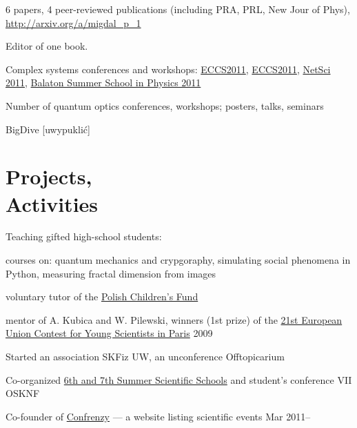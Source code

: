 \documentclass[margin,line]{resume}
\begin{document}
\begin{resume}
    6 papers, 4 peer-reviewed publications (including PRA, PRL, New Jour of Phys), \href{all available openly on arXiv}{http://arxiv.org/a/migdal\_p\_1}

    Editor of one book.

    Complex systems conferences and workshops: \href{http://www.eccs2012.eu/}{ECCS2011}, \href{http://www.eccs2011.eu/}{ECCS2011}, \href{http://netsci2011.net/}{NetSci 2011}, \href{http://bss.mafihe.hu/}{Balaton Summer School in Physics 2011}

    Number of quantum optics conferences, workshops; posters, talks, seminars

    BigDive [uwypuklić]


\vspace{3mm}


    \section{\mysidestyle Projects,\\Activities}
    Teaching gifted high-school students:
    \begin{list2}
        \item courses on: quantum mechanics and crypgoraphy, simulating social phenomena in Python, measuring fractal dimension from images
        \item voluntary tutor of the \href{http://www.fundusz.org/?lang=gb}{Polish Children's Fund} 
        \item mentor of A. Kubica and W. Pilewski, winners (1st prize) of the \href{http://www.eucys09.fr/}{21st European Union Contest for Young Scientists in Paris}  \hfill 2009
    \end{list2} 

    Started an association SKFiz UW, an unconference Offtopicarium

    Co-organized \href{http://warsztatywww.wikidot.com/en}{6th and 7th  Summer Scientific Schools} and student's conference VII OSKNF

    Co-founder of \href{http://confrenzy.com}{Confrenzy} --- a website listing scientific events \hfill Mar 2011--


\vspace{3mm}


\end{resume}
\end{document}
